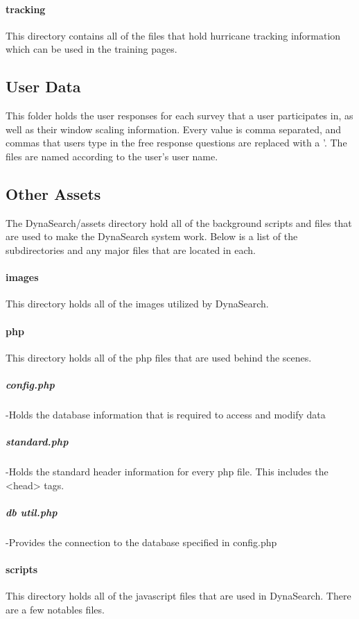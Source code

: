\documentclass[article]{ij4uq}              %
\begin{document}
\paragraph{tracking}
This directory contains all of the files that hold hurricane tracking information which can be used in the training pages.

\subsection{User Data}
This folder holds the user responses for each survey that a user participates in, as well as their window scaling information. Every value is comma separated, and commas that users type in the free response questions are replaced with a '. The files are named according to the user's user name.

\subsection{Other Assets}
The DynaSearch/assets directory hold all of the background scripts and files that are used to make the DynaSearch system work. Below is a list of the subdirectories and any major files that are located in each.

\paragraph{images}
This directory holds all of the images utilized by DynaSearch.

\paragraph{php}
This directory holds all of the php files that are used behind the scenes.

\subparagraph{config.php} -Holds the database information that is required to access and modify data 

\subparagraph{standard.php} -Holds the standard header information for every php file. This includes the <head> tags. 
	
\subparagraph{db util.php} -Provides the connection to the database specified in config.php

\paragraph{scripts}
This directory holds all of the javascript files that are used in DynaSearch. There are a few notables files. 
\end{document}

